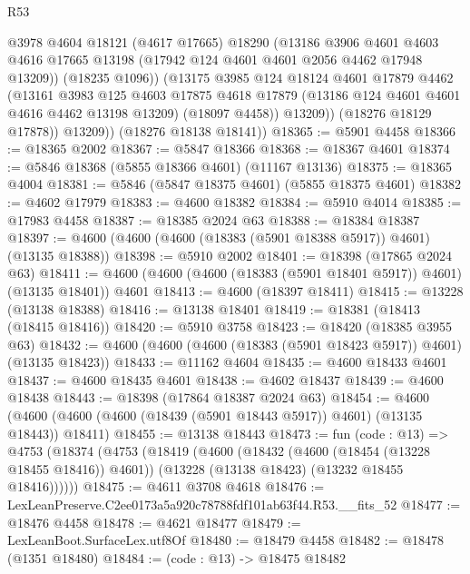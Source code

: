 \begin{lexlean}{R53}
\begin{coremodule}
                @3978
                @4604
                @18121
                (@4617 @17665)
                @18290
                (@13186
                  @3906
                  @4601
                  @4603
                  @4616
                  @17665
                  @13198
                  (@17942 @124 @4601 @4601 @2056 @4462 @17948 @13209))
                (@18235 @1096))
              (@13175
                @3985
                @124
                @18124
                @4601
                @17879
                @4462
                (@13161
                  @3983
                  @125
                  @4603
                  @17875
                  @4618
                  @17879
                  (@13186 @124 @4601 @4601 @4616 @4462 @13198 @13209)
                  (@18097 @4458))
                @13209))
            (@18276 @18129 @17878))
          @13209))
      (@18276 @18138 @18141))
@18365 := @5901 @4458
@18366 := @18365 @2002
@18367 := @5847 @18366
@18368 := @18367 @4601
@18374 := @5846 @18368 (@5855 @18366 @4601) (@11167 @13136)
@18375 := @18365 @4004
@18381 := @5846 (@5847 @18375 @4601) (@5855 @18375 @4601)
@18382 := @4602 @17979
@18383 := @4600 @18382
@18384 := @5910 @4014
@18385 := @17983 @4458
@18387 := @18385 @2024 @63
@18388 := @18384 @18387
@18397 := @4600 (@4600 (@4600 (@18383 (@5901 @18388 @5917)) @4601) (@13135 @18388))
@18398 := @5910 @2002
@18401 := @18398 (@17865 @2024 @63)
@18411 := @4600 (@4600 (@4600 (@18383 (@5901 @18401 @5917)) @4601) (@13135 @18401)) @4601
@18413 := @4600 (@18397 @18411)
@18415 := @13228 (@13138 @18388)
@18416 := @13138 @18401
@18419 := @18381 (@18413 (@18415 @18416))
@18420 := @5910 @3758
@18423 := @18420 (@18385 @3955 @63)
@18432 := @4600 (@4600 (@4600 (@18383 (@5901 @18423 @5917)) @4601) (@13135 @18423))
@18433 := @11162 @4604
@18435 := @4600 @18433 @4601
@18437 := @4600 @18435 @4601
@18438 := @4602 @18437
@18439 := @4600 @18438
@18443 := @18398 (@17864 @18387 @2024 @63)
@18454 := @4600 (@4600 (@4600 (@4600 (@18439 (@5901 @18443 @5917)) @4601) (@13135 @18443)) @18411)
@18455 := @13138 @18443
@18473 := fun (code : @13) =>
  @4753
    (@18374
      (@4753
        (@18419
          (@4600
            (@18432 (@4600 (@18454 (@13228 @18455 @18416)) @4601))
            (@13228 (@13138 @18423) (@13232 @18455 @18416))))))
@18475 := @4611 @3708 @4618
@18476 := LexLeanPreserve.C2ee0173a5a920c78788fdf101ab63f44.R53.__fits_52
@18477 := @18476 @4458
@18478 := @4621 @18477
@18479 := LexLeanBoot.SurfaceLex.utf8Of
@18480 := @18479 @4458
@18482 := @18478 (@1351 @18480)
@18484 := (code : @13) -> @18475 @18482

\end{coremodule}
\end{lexlean}
